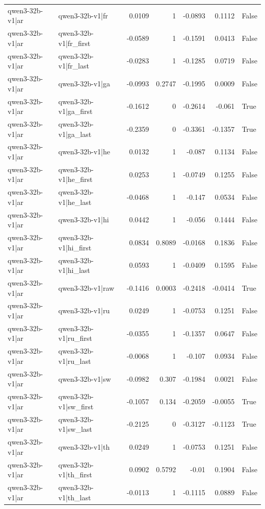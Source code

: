 \begin{table}
\begin{tabular}{l l r r r r l}
qwen3-32b-v1|ar & qwen3-32b-v1|fr & 0.0109 & 1 & -0.0893 & 0.1112 & False \\
qwen3-32b-v1|ar & qwen3-32b-v1|fr_first & -0.0589 & 1 & -0.1591 & 0.0413 & False \\
qwen3-32b-v1|ar & qwen3-32b-v1|fr_last & -0.0283 & 1 & -0.1285 & 0.0719 & False \\
qwen3-32b-v1|ar & qwen3-32b-v1|ga & -0.0993 & 0.2747 & -0.1995 & 0.0009 & False \\
qwen3-32b-v1|ar & qwen3-32b-v1|ga_first & -0.1612 & 0 & -0.2614 & -0.061 & True \\
qwen3-32b-v1|ar & qwen3-32b-v1|ga_last & -0.2359 & 0 & -0.3361 & -0.1357 & True \\
qwen3-32b-v1|ar & qwen3-32b-v1|he & 0.0132 & 1 & -0.087 & 0.1134 & False \\
qwen3-32b-v1|ar & qwen3-32b-v1|he_first & 0.0253 & 1 & -0.0749 & 0.1255 & False \\
qwen3-32b-v1|ar & qwen3-32b-v1|he_last & -0.0468 & 1 & -0.147 & 0.0534 & False \\
qwen3-32b-v1|ar & qwen3-32b-v1|hi & 0.0442 & 1 & -0.056 & 0.1444 & False \\
qwen3-32b-v1|ar & qwen3-32b-v1|hi_first & 0.0834 & 0.8089 & -0.0168 & 0.1836 & False \\
qwen3-32b-v1|ar & qwen3-32b-v1|hi_last & 0.0593 & 1 & -0.0409 & 0.1595 & False \\
qwen3-32b-v1|ar & qwen3-32b-v1|raw & -0.1416 & 0.0003 & -0.2418 & -0.0414 & True \\
qwen3-32b-v1|ar & qwen3-32b-v1|ru & 0.0249 & 1 & -0.0753 & 0.1251 & False \\
qwen3-32b-v1|ar & qwen3-32b-v1|ru_first & -0.0355 & 1 & -0.1357 & 0.0647 & False \\
qwen3-32b-v1|ar & qwen3-32b-v1|ru_last & -0.0068 & 1 & -0.107 & 0.0934 & False \\
qwen3-32b-v1|ar & qwen3-32b-v1|sw & -0.0982 & 0.307 & -0.1984 & 0.0021 & False \\
qwen3-32b-v1|ar & qwen3-32b-v1|sw_first & -0.1057 & 0.134 & -0.2059 & -0.0055 & True \\
qwen3-32b-v1|ar & qwen3-32b-v1|sw_last & -0.2125 & 0 & -0.3127 & -0.1123 & True \\
qwen3-32b-v1|ar & qwen3-32b-v1|th & 0.0249 & 1 & -0.0753 & 0.1251 & False \\
qwen3-32b-v1|ar & qwen3-32b-v1|th_first & 0.0902 & 0.5792 & -0.01 & 0.1904 & False \\
qwen3-32b-v1|ar & qwen3-32b-v1|th_last & -0.0113 & 1 & -0.1115 & 0.0889 & False \\

\end{tabular}
\end{table}
